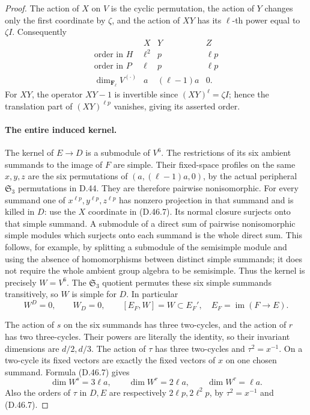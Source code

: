 \begin{proof}
The action of \(X\) on \(V\) is the cyclic permutation,
the action of \(Y\) changes only the first coordinate by
\(\zeta\), and the action of \(XY\) has its \(\ell\)-th
power equal to \(\zeta I\). Consequently
\[
 \begin{array}{c|ccc}
       &X&Y&Z\\ \hline
 \text{order in }H&\ell^2&p&\ell p\\
 \text{order in }P&\ell&p&\ell p\\
 \dim_{\mathbf F_\ell}V^{(\cdot)}&a&(\ell-1)a&0.
 \end{array}
 \tag{D.46.7}
\]
For \(XY\), the operator \(XY-1\) is invertible since
\((XY)^\ell=\zeta I\); hence the translation part of
\((XY)^{\ell p}\) vanishes, giving its asserted order.

\paragraph{The entire induced kernel.}
The kernel of \(E\to D\) is a submodule of \(V^6\).
The restrictions of its six ambient summands to the image of
\(F\) are simple. Their fixed-space profiles on the same
\(x,y,z\) are the six permutations of
\((a,(\ell-1)a,0)\), by the actual peripheral
\(\mathfrak S_3\) permutations in D.44.
They are therefore pairwise nonisomorphic.
For every summand one of
\(x^{\ell p},y^{\ell p},z^{\ell p}\) has nonzero
projection in that summand and is killed in \(D\):
use the \(X\) coordinate in \textup{(D.46.7)}.
Its normal closure surjects onto that simple summand.
A submodule of a direct sum of pairwise nonisomorphic simple
modules which surjects onto each summand is the whole direct
sum. This follows, for example, by splitting a submodule of
the semisimple module and using the absence of homomorphisms
between distinct simple summands; it does not require the
whole ambient group algebra to be semisimple.
Thus the kernel is precisely \(W=V^6\).
The \(\mathfrak S_3\) quotient permutes these six simple
summands transitively, so \(W\) is simple for \(D\).
In particular
\[
 W^D=0,
 \qquad W_D=0,
 \qquad [E_F,W]=W\subset E_F',
 \quad E_F=\operatorname{im}(F\to E).
 \tag{D.46.8}
\]

The action of \(s\) on the six summands has three two-cycles,
and the action of \(r\) has two three-cycles. Their powers
are literally the identity, so their invariant dimensions
are \(d/2,d/3\). The action of \(\tau\) has three
two-cycles and \(\tau^2=x^{-1}\). On a two-cycle its
fixed vectors are exactly the fixed vectors of \(x\) on
one chosen summand. Formula \textup{(D.46.7)} gives
\[
 \dim W^s=3\ell a,\qquad
 \dim W^r=2\ell a,\qquad
 \dim W^\tau=\ell a.
 \tag{D.46.9}
\]
Also the orders of \(\tau\) in \(D,E\) are respectively
\(2\ell p,2\ell^2p\), by \(\tau^2=x^{-1}\) and
\textup{(D.46.7)}.


\end{proof}
